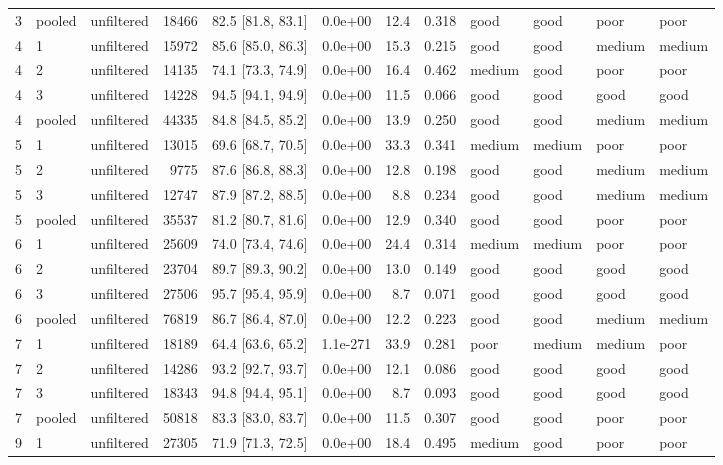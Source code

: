 \begin{longtable}{lllrrrrrllll}
3 & pooled & unfiltered & 18466 & 82.5 [81.8, 83.1] & 0.0e+00 & 12.4 & 0.318 & good & good & poor & poor \\
4 & 1 & unfiltered & 15972 & 85.6 [85.0, 86.3] & 0.0e+00 & 15.3 & 0.215 & good & good & medium & medium \\
4 & 2 & unfiltered & 14135 & 74.1 [73.3, 74.9] & 0.0e+00 & 16.4 & 0.462 & medium & good & poor & poor \\
4 & 3 & unfiltered & 14228 & 94.5 [94.1, 94.9] & 0.0e+00 & 11.5 & 0.066 & good & good & good & good \\
4 & pooled & unfiltered & 44335 & 84.8 [84.5, 85.2] & 0.0e+00 & 13.9 & 0.250 & good & good & medium & medium \\
5 & 1 & unfiltered & 13015 & 69.6 [68.7, 70.5] & 0.0e+00 & 33.3 & 0.341 & medium & medium & poor & poor \\
5 & 2 & unfiltered & 9775 & 87.6 [86.8, 88.3] & 0.0e+00 & 12.8 & 0.198 & good & good & medium & medium \\
5 & 3 & unfiltered & 12747 & 87.9 [87.2, 88.5] & 0.0e+00 & 8.8 & 0.234 & good & good & medium & medium \\
5 & pooled & unfiltered & 35537 & 81.2 [80.7, 81.6] & 0.0e+00 & 12.9 & 0.340 & good & good & poor & poor \\
6 & 1 & unfiltered & 25609 & 74.0 [73.4, 74.6] & 0.0e+00 & 24.4 & 0.314 & medium & medium & poor & poor \\
6 & 2 & unfiltered & 23704 & 89.7 [89.3, 90.2] & 0.0e+00 & 13.0 & 0.149 & good & good & good & good \\
6 & 3 & unfiltered & 27506 & 95.7 [95.4, 95.9] & 0.0e+00 & 8.7 & 0.071 & good & good & good & good \\
6 & pooled & unfiltered & 76819 & 86.7 [86.4, 87.0] & 0.0e+00 & 12.2 & 0.223 & good & good & medium & medium \\
7 & 1 & unfiltered & 18189 & 64.4 [63.6, 65.2] & 1.1e-271 & 33.9 & 0.281 & poor & medium & medium & poor \\
7 & 2 & unfiltered & 14286 & 93.2 [92.7, 93.7] & 0.0e+00 & 12.1 & 0.086 & good & good & good & good \\
7 & 3 & unfiltered & 18343 & 94.8 [94.4, 95.1] & 0.0e+00 & 8.7 & 0.093 & good & good & good & good \\
7 & pooled & unfiltered & 50818 & 83.3 [83.0, 83.7] & 0.0e+00 & 11.5 & 0.307 & good & good & poor & poor \\
9 & 1 & unfiltered & 27305 & 71.9 [71.3, 72.5] & 0.0e+00 & 18.4 & 0.495 & medium & good & poor & poor \\

\end{longtable}
